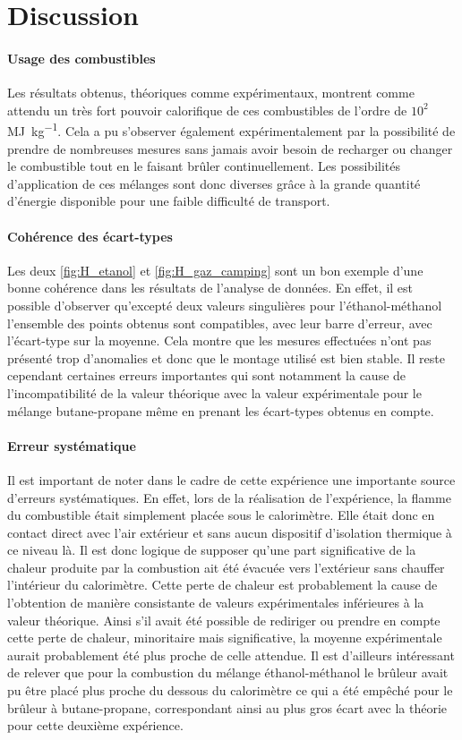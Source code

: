 \section{Discussion}

\paragraph*{Usage des combustibles}
Les résultats obtenus, théoriques comme expérimentaux, montrent comme attendu un très fort pouvoir calorifique de ces combustibles de l'ordre de \(10^2\) \si{\mega\joule\per\kilo\gram}. Cela a pu s'observer également expérimentalement par la possibilité de prendre de nombreuses mesures sans jamais avoir besoin de recharger ou changer le combustible tout en le faisant brûler continuellement. Les possibilités d'application de ces mélanges sont donc diverses grâce à la grande quantité d'énergie disponible pour une faible difficulté de transport.

\paragraph*{Cohérence des écart-types}
Les deux \autoref{fig:H_etanol} et \autoref{fig:H_gaz_camping} sont un bon exemple d'une bonne cohérence dans les résultats de l'analyse de données. En effet, il est possible d'observer qu'excepté deux valeurs singulières pour l'éthanol-méthanol l'ensemble des points obtenus sont compatibles, avec leur barre d'erreur, avec l'écart-type sur la moyenne. Cela montre que les mesures effectuées n'ont pas présenté trop d'anomalies et donc que le montage utilisé est bien stable. Il reste cependant certaines erreurs importantes qui sont notamment la cause de l'incompatibilité de la valeur théorique avec la valeur expérimentale pour le mélange butane-propane même en prenant les écart-types obtenus en compte. 


\paragraph*{Erreur systématique}
Il est important de noter dans le cadre de cette expérience une importante source d'erreurs systématiques. En effet, lors de la réalisation de l'expérience, la flamme du combustible était simplement placée sous le calorimètre. Elle était donc en contact direct avec l'air extérieur et sans aucun dispositif d'isolation thermique à ce niveau là. Il est donc logique de supposer qu'une part significative de la chaleur produite par la combustion ait été évacuée vers l'extérieur sans chauffer l'intérieur du calorimètre. Cette perte de chaleur est probablement la cause de l'obtention de manière consistante de valeurs expérimentales inférieures à la valeur théorique. Ainsi s'il avait été possible de rediriger ou prendre en compte cette perte de chaleur, minoritaire mais significative, la moyenne expérimentale aurait probablement été plus proche de celle attendue. Il est d'ailleurs intéressant de relever que pour la combustion du mélange éthanol-méthanol le brûleur avait pu être placé plus proche du dessous du calorimètre ce qui a été empêché pour le brûleur à butane-propane, correspondant ainsi au plus gros écart avec la théorie pour cette deuxième expérience.


